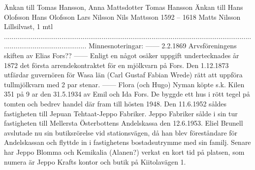 Änkan till Tomas Hansson, Anna Mattsdotter Tomas Hansson
Änkan till Hans Olofsson
Hans Olofsson
Lars Nilsson Nils Mattsson
1592 – 1618 Matts Nilsson
Lillsilvast, 1 mtl
............................................................................................................................................................................
Minnesnoteringar:
------
2.2.1869 Arvsföreningens skiften av Elias Fors?? ------
Enligt en något osäker uppgift undertecknades år 1872 det första arrendekontraktet för en mjölkvarn på Fors. Den 1.12.1873 utfärdar guvernören för Wasa län (Carl Gustaf Fabian Wrede) rätt att uppföra
tullmjölkvarn med 2 par stenar. ------
Flora (och Hugo) Nyman köpte s.k. Kilen 351 på 9 ar den 31.5.1934 av Emil och Ida Fors. De byggde ett hus i rött tegel på tomten och bedrev handel där fram till hösten 1948. Den 11.6.1952 såldes fastigheten till Jepuan Tehtaat-Jeppo Fabriker. Jeppo Fabriker sålde i sin tur fastigheten till Mellersta Österbottens Andelskassa den 12.6.1953. Eliel Brunell avslutade nu sin butiksrörelse vid stationsvägen, då han blev föreståndare för Andelskassan och flyttde in i fastighetens bostadsutrymme med sin familj. Senare har Jeppo Blomma och Kemikalia (Alanen?) verkat en kort tid på platsen, som numera är Jeppo Krafts kontor och butik på Kiitolavägen 1.
